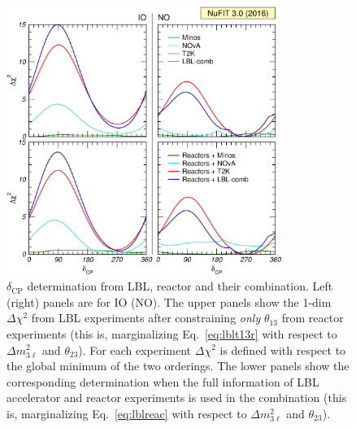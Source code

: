 \documentclass[a4paper, 11pt]{article}
\newcommand{\Dmq}{\Delta m^2}
\begin{document}
\begin{figure}\centering
  \includegraphics[width=0.8\textwidth]{fig-chisq-dcp}
  \caption{$\delta_\text{CP}$ determination from LBL, reactor and
    their combination. Left (right) panels are for IO (NO). The upper
    panels show the 1-dim $\Delta\chi^2$ from LBL experiments after
    constraining \emph{only} $\theta_{13}$ from reactor experiments
    (this is, marginalizing Eq.~\eqref{eq:lblt13r} with respect to
    $\Dmq_{3\ell}$ and $\theta_{23}$). For each experiment
    $\Delta\chi^2$ is defined with respect to the global minimum of
    the two orderings.  The lower panels show the corresponding
    determination when the full information of LBL accelerator and
    reactor experiments is used in the combination (this is,
    marginalizing Eq.~\eqref{eq:lblreac} with respect to
    $\Dmq_{3\ell}$ and $\theta_{23}$).}
  \label{fig:chisq-dcp}
\end{figure}
\end{document}

